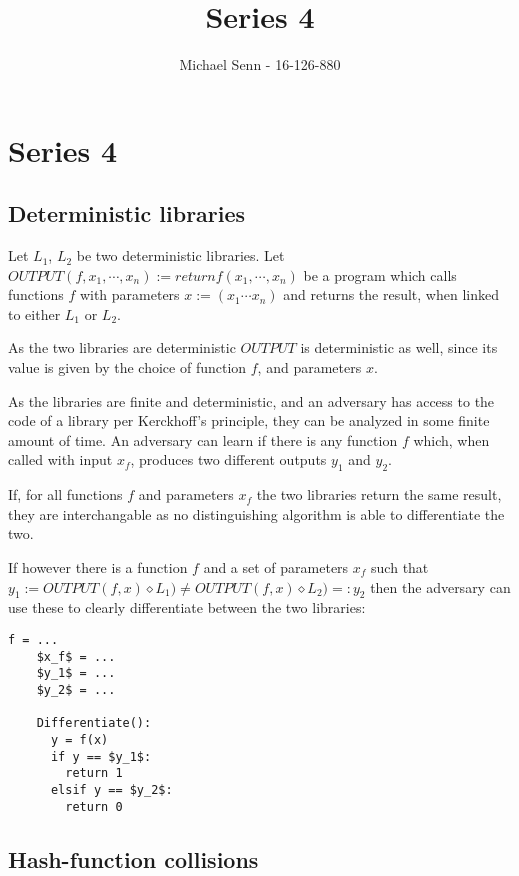 \documentclass[a4paper]{scrreprt}
\title{Series 4}
\author{Michael Senn \maillink{michael.senn@students.unibe.ch} - 16-126-880}
\date{\printdate}
\begin{document}
\maketitle


\setcounter{chapter}{3}
\chapter{Series 4}

\section{Deterministic libraries}

Let $L_1$, $L_2$ be two deterministic libraries. Let $OUTPUT(f, x_1, \cdots,
x_n) := return f(x_1, \cdots, x_n)$ be a program which calls functions $f$ with
parameters $x := (x_1 \cdots x_n)$ and returns the result, when linked to
either $L_1$ or $L_2$.

As the two libraries are deterministic $OUTPUT$ is deterministic as well,
since its value is given by the choice of function $f$, and parameters $x$.

As the libraries are finite and deterministic, and an adversary has access to
the code of a library per Kerckhoff's principle, they can be analyzed in some
finite amount of time. An adversary can learn if there is any function $f$
which, when called with input $x_f$, produces two different outputs $y_1$ and
$y_2$.

If, for all functions $f$ and parameters $x_f$ the two libraries return the
same result, they are interchangable as no distinguishing algorithm is able to
differentiate the two.

If however there is a function $f$ and a set of parameters $x_f$ such that $y_1
:= OUTPUT(f, x) \diamond L_1) \neq OUTPUT(f, x) \diamond L_2) =: y_2$ then the
adversary can use these to clearly differentiate between the two libraries:

\begin{lstlisting}[mathescape=true, frame=single]
	f = ...
	$x_f$ = ...
	$y_1$ = ...
	$y_2$ = ...

	Differentiate():
	  y = f(x)
	  if y == $y_1$:
	    return 1
	  elsif y == $y_2$:
	    return 0
\end{lstlisting}

\section{Hash-function collisions}
\end{document}
